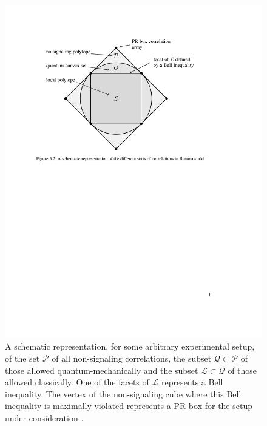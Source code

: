 \begin{figure}[h]
\centering
    \includegraphics[width=5in]{LQP.pdf}
 \caption{A schematic representation, for some arbitrary experimental setup, of the set $\mathcal{P}$ of all non-signaling correlations, the subset $\mathcal{Q} \subset \mathcal{P}$ of those allowed quantum-mechanically and the subset $\mathcal{L} \subset \mathcal{Q}$ of those allowed classically. One of the facets of $\mathcal{L}$ represents a Bell inequality. The vertex of the non-signaling cube where this Bell inequality is maximally violated represents a PR box for the setup under consideration \citep[p.\ 107, Figure 5.2]{Bub 2016}.}
   \label{LQP}
\end{figure}

